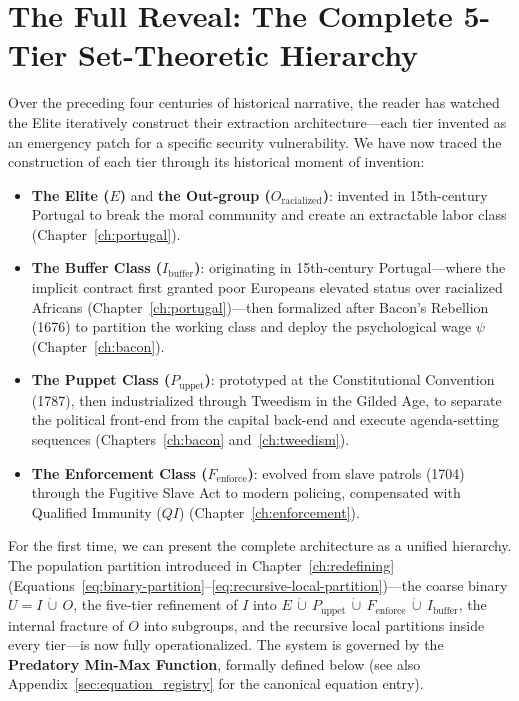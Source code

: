 \section{The Full Reveal: The Complete 5-Tier Set-Theoretic Hierarchy}
\label{sec:full_reveal}

Over the preceding four centuries of historical narrative, the reader has watched the Elite iteratively construct their extraction architecture---each tier invented as an emergency patch for a specific security vulnerability. We have now traced the construction of each tier through its historical moment of invention:

\begin{itemize}
    \item \textbf{The Elite ($E$)} and \textbf{the Out-group ($O_{\text{racialized}}$)}: invented in 15th-century Portugal to break the moral community and create an extractable labor class (Chapter~\ref{ch:portugal}).
    \item \textbf{The Buffer Class ($I_{\text{buffer}}$)}: originating in 15th-century Portugal---where the implicit contract first granted poor Europeans elevated status over racialized Africans (Chapter~\ref{ch:portugal})---then formalized after Bacon's Rebellion (1676) to partition the working class and deploy the psychological wage $\psi$ (Chapter~\ref{ch:bacon}).
    \item \textbf{The Puppet Class ($P_{\text{uppet}}$)}: prototyped at the Constitutional Convention (1787), then industrialized through Tweedism in the Gilded Age, to separate the political front-end from the capital back-end and execute agenda-setting sequences (Chapters~\ref{ch:bacon} and~\ref{ch:tweedism}).
    \item \textbf{The Enforcement Class ($F_{\text{enforce}}$)}: evolved from slave patrols (1704) through the Fugitive Slave Act to modern policing, compensated with Qualified Immunity ($QI$) (Chapter~\ref{ch:enforcement}).
\end{itemize}

For the first time, we can present the complete architecture as a unified hierarchy. The population partition introduced in Chapter~\ref{ch:redefining} (Equations~\ref{eq:binary-partition}--\ref{eq:recursive-local-partition})---the coarse binary $U = I \,\dot\cup\, O$, the five-tier refinement of $I$ into $E \,\dot\cup\, P_{\text{uppet}} \,\dot\cup\, F_{\text{enforce}} \,\dot\cup\, I_{\text{buffer}}$, the internal fracture of $O$ into subgroups, and the recursive local partitions inside every tier---is now fully operationalized. The system is governed by the \textbf{Predatory Min-Max Function}, formally defined below (see also Appendix~\ref{sec:equation_registry} for the canonical equation entry).

